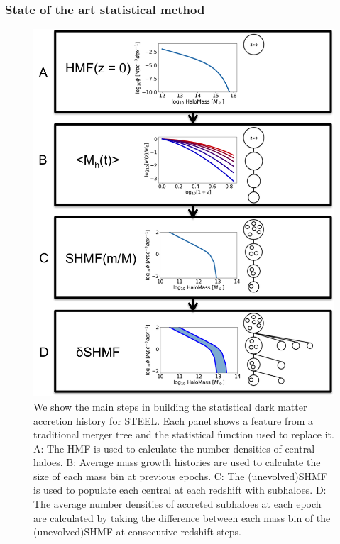 \subsubsection{State of the art statistical method}
\begin{figure}[h!]
    \centering
    \includegraphics[width = \linewidth]{Figures/Chapter2/StatDM.png}
    \caption{We show the main steps in building the statistical dark matter accretion history for STEEL. Each panel shows a feature from a traditional merger tree and the statistical function used to replace it. A: The HMF is used to calculate the number densities of central haloes. B: Average mass growth histories are used to calculate the size of each mass bin at previous epochs. C: The (unevolved)SHMF is used to populate each central at each redshift with subhaloes. D: The average number densities of accreted subhaloes at each epoch are calculated by taking the difference between each mass bin of the (unevolved)SHMF at consecutive redshift steps.}
    \label{fig:StatDM}
\end{figure}


